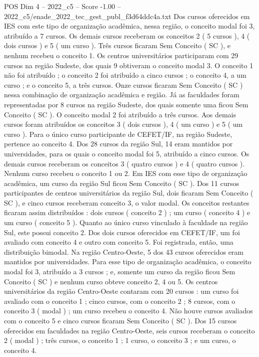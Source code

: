 \begin{textsample}{POS Dim 4 – 2022\_c5 – Score -1.00 – 2022\_c5/enade\_2022\_tec\_gest\_publ\_f3d64ddc4a.txt}
Dos cursos oferecidos em IES com este tipo de organização acadêmica, nessa região, o conceito modal foi 3, atribuído a 7 cursos.
Os demais cursos receberam os conceitos 2 ( 5 cursos ), 4 ( dois cursos ) e 5 ( um curso ).
Três cursos ficaram Sem Conceito ( SC ), e nenhum recebeu o conceito 1.
Os centros universitários participaram com 29 cursos na região Sudeste, dos quais 9 obtiveram o conceito modal 3.
O conceito 1 não foi atribuído ; o conceito 2 foi atribuído a cinco cursos ; o conceito 4, a um curso ; e o conceito 5, a três cursos.
Onze cursos ficaram Sem Conceito ( SC ) nessa combinação de organização acadêmica e região.
Já as faculdades foram representadas por 8 cursos na região Sudeste, dos quais somente uma ficou Sem Conceito ( SC ).
O conceito modal 2 foi atribuído a três cursos.
Aos demais cursos foram atribuídos os conceitos 3 ( dois cursos ), 4 ( um curso ) e 5 ( um curso ).
Para o único curso participante de CEFET/IF, na região Sudeste, pertence ao conceito 4.
Dos 28 cursos da região Sul, 14 eram mantidos por universidades, para os quais o conceito modal foi 5, atribuído a cinco cursos.
Os demais cursos receberam os conceitos 3 ( quatro cursos ) e 4 ( quatro cursos ).
Nenhum curso recebeu o conceito 1 ou 2.
Em IES com esse tipo de organização acadêmica, um curso da região Sul ficou Sem Conceito ( SC ).
Dos 11 cursos participantes de centros universitários da região Sul, dois ficaram Sem Conceito ( SC ), e cinco cursos receberam conceito 3, o valor modal.
Os conceitos restantes ficaram assim distribuídos : dois cursos ( conceito 2 ) ; um curso ( conceito 4 ) e um curso ( conceito 5 ).
Quanto ao único curso vinculado à faculdade na região Sul, este possui conceito 2.
Dos dois cursos oferecidos em CEFET/IF, um foi avaliado com conceito 4 e outro com conceito 5.
Foi registrada, então, uma distribuição bimodal.
Na região Centro-Oeste, 5 dos 43 cursos oferecidos eram mantidos por universidades.
Para esse tipo de organização acadêmica, o conceito modal foi 3, atribuído a 3 cursos ; e, somente um curso da região ficou Sem Conceito ( SC ) e nenhum curso obteve conceito 2, 4 ou 5.
Os centros universitários da região Centro-Oeste contaram com 20 cursos : um curso foi avaliado com o conceito 1 ; cinco cursos, com o conceito 2 ; 8 cursos, com o conceito 3 ( modal ) ; um curso recebeu o conceito 4.
Não houve cursos avaliados com o conceito 5 e cinco cursos ficaram Sem Conceito ( SC ).
Dos 15 cursos oferecidos em faculdades na região Centro-Oeste, seis cursos receberam o conceito 2 ( modal ) ; três cursos, o conceito 1 ; 1 curso, o conceito 3 ; e um curso, o conceito 4.

\end{textsample}
